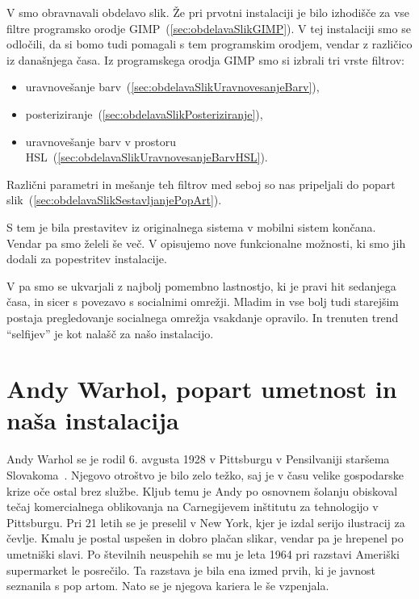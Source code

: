 \documentclass[a4paper, 12pt]{book}
\begin{document}
V  smo obravnavali obdelavo slik. Že pri prvotni
instalaciji je bilo izhodišče za vse filtre programsko orodje
GIMP~(\ref{sec:obdelavaSlikGIMP}). V tej instalaciji smo se odločili, da si
bomo tudi pomagali s tem programskim orodjem, vendar z različico iz današnjega
časa. Iz programskega orodja GIMP smo si izbrali tri vrste filtrov:
\begin{itemize}
    \item uravnovešanje barv~(\ref{sec:obdelavaSlikUravnovesanjeBarv}),
    \item posteriziranje~(\ref{sec:obdelavaSlikPosteriziranje}),
    \item uravnovešanje barv v prostoru HSL~(\ref{sec:obdelavaSlikUravnovesanjeBarvHSL}).
\end{itemize}
Različni parametri in mešanje teh filtrov med seboj so nas pripeljali do
popart slik~(\ref{sec:obdelavaSlikSestavljanjePopArt}).

S tem je bila prestavitev iz originalnega sistema v mobilni sistem končana.
Vendar pa smo želeli še več. V  opisujemo nove
funkcionalne možnosti, ki smo jih dodali za popestritev instalacije.

V  pa smo se ukvarjali z najbolj pomembno
lastnostjo, ki je pravi hit sedanjega časa, in sicer s povezavo s socialnimi
omrežji. Mladim in vse bolj tudi starejšim postaja pregledovanje socialnega
omrežja vsakdanje opravilo. In trenuten trend ``selfijev'' je kot nalašč za
našo instalacijo.


\chapter{Andy Warhol, popart umetnost in naša instalacija}
\label{ch:AndyWarhol_popart}
Andy Warhol se je rodil 6. avgusta 1928 v Pittsburgu v Pensilvaniji staršema
Slovakoma~\cite{wiki:AndyWarhol}. Njegovo otroštvo je bilo zelo težko, saj je
v času velike gospodarske krize oče ostal brez službe. Kljub temu je Andy po
osnovnem šolanju obiskoval tečaj komercialnega oblikovanja na Carnegijevem
inštitutu za tehnologijo v Pittsburgu. Pri 21 letih se je preselil v New
York, kjer je izdal serijo ilustracij za čevlje. Kmalu je postal uspešen in
dobro plačan slikar, vendar pa je hrepenel po umetniški slavi. Po številnih
neuspehih se mu je leta 1964 pri razstavi Ameriški supermarket le posrečilo.
Ta razstava je bila ena izmed prvih, ki je javnost seznanila s pop artom. Nato
se je njegova kariera le še vzpenjala.
\end{document}
